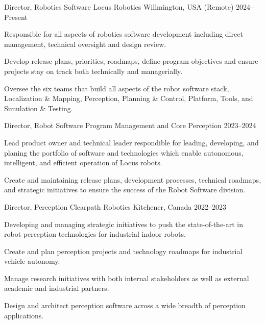 \documentclass[11pt, a4paper]{awesome-cv}
\begin{document}
\vspace*{-4mm}
\begin{cventries}
\vspace*{-1mm}
\cventry
  {Director, Robotics Software}
  {Locus Robotics}
  {Willmington, USA (Remote)}
  {2024--Present}
  {
    \begin{cvitems}
      \item Responsible for all aspects of robotics software development including direct management, technical oversight and design review.
      \item Develop release plans, priorities, roadmaps, define program objectives and ensure projects stay on track both technically and managerially.
      \item Oversee the six teams that build all aspects of the robot software stack, Localization \& Mapping, Perception, Planning \& Control, Platform, Tools, and Simulation \& Testing.
    \end{cvitems}
  }

\vspace*{-2mm}
\cventry
  {Director, Robot Software Program Management and Core Perception}
  {}
  {}
  {2023--2024}
  {
    \begin{cvitems}
      \item Lead product owner and technical leader respondible for leading, developing, and planing the portfolio of software and technologies which enable autonomous, intelligent, and efficient operation of Locus robots.
      \item Create and maintaining release plans, development processes, technical roadmaps, and strategic initiatives to ensure the success of the Robot Software division.    
    \end{cvitems} 
  }


\cventry
  {Director, Perception}
  {Clearpath Robotics}
  {Kitchener, Canada}
  {2022--2023}
  {
    \begin{cvitems}
      \item Developing and managing strategic initiatives to push the state-of-the-art in robot perception technologies for industrial indoor robots. 
      \item Create and plan perception projects and technology roadmaps for industrial vehicle autonomy. 
      \item Manage research initiatives with both internal stakeholders as well as external academic and industrial partners. 
      \item Design and architect perception software across a wide breadth of perception applications.
    \end{cvitems} 
  }


\end{cventries}
\end{document}
